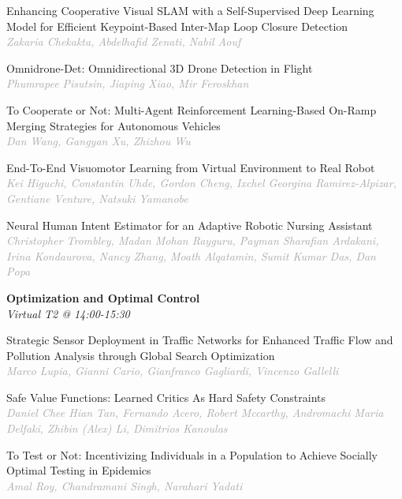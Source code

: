 \begin{multicols*}{2}
\small Enhancing Cooperative Visual SLAM with a Self-Supervised Deep Learning Model for Efficient Keypoint-Based Inter-Map Loop Closure Detection\\ 
\footnotesize \textcolor{darkgray}{\textit{Zakaria Chekakta, Abdelhafid  Zenati, Nabil  Aouf}}

\small Omnidrone-Det: Omnidirectional 3D Drone Detection in Flight\\ 
\footnotesize \textcolor{darkgray}{\textit{Phumrapee Pisutsin, Jiaping  Xiao, Mir  Feroskhan}}

\small To Cooperate or Not: Multi-Agent Reinforcement Learning-Based On-Ramp Merging Strategies for Autonomous Vehicles\\ 
\footnotesize \textcolor{darkgray}{\textit{Dan Wang, Gangyan  Xu, Zhizhou  Wu}}

\small End-To-End Visuomotor Learning from Virtual Environment to Real Robot\\ 
\footnotesize \textcolor{darkgray}{\textit{Kei Higuchi, Constantin  Uhde, Gordon  Cheng, Ixchel Georgina  Ramirez-Alpizar, Gentiane  Venture, Natsuki  Yamanobe}}

\small Neural Human Intent Estimator for an Adaptive Robotic Nursing Assistant\\ 
\footnotesize \textcolor{darkgray}{\textit{Christopher Trombley, Madan Mohan  Rayguru, Payman  Sharafian Ardakani, Irina  Kondaurova, Nancy  Zhang, Moath  Alqatamin, Sumit Kumar  Das, Dan  Popa}}

\normalsize \textbf{Optimization and Optimal Control}\\
\small \textit{Virtual T2 @ 14:00-15:30}

\small Strategic Sensor Deployment in Traffic Networks for Enhanced Traffic Flow and Pollution Analysis through Global Search Optimization\\ 
\footnotesize \textcolor{darkgray}{\textit{Marco Lupia, Gianni  Cario, Gianfranco  Gagliardi, Vincenzo  Gallelli}}

\small Safe Value Functions: Learned Critics As Hard Safety Constraints\\ 
\footnotesize \textcolor{darkgray}{\textit{Daniel Chee Hian Tan, Fernando  Acero, Robert  Mccarthy, Andromachi Maria  Delfaki, Zhibin (Alex)  Li, Dimitrios  Kanoulas}}

\small To Test or Not: Incentivizing Individuals in a Population to Achieve Socially Optimal Testing in Epidemics\\ 
\footnotesize \textcolor{darkgray}{\textit{Amal Roy, Chandramani  Singh, Narahari  Yadati}}


\end{multicols*}
